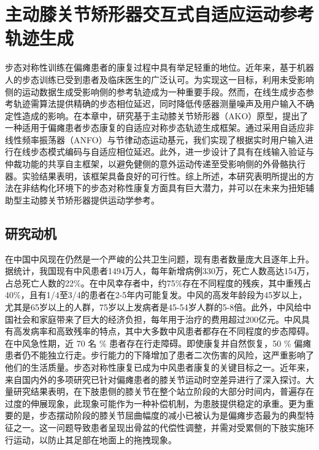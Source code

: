 \chapter{主动膝关节矫形器交互式自适应运动参考轨迹生成}
步态对称性训练在偏瘫患者的康复过程中具有举足轻重的地位。近年来，基于机器人的步态训练已受到患者及临床医生的广泛认可。为实现这一目标，利用未受影响侧的运动数据生成受影响侧的参考轨迹成为一种重要手段。然而，在线生成步态参考轨迹需算法提供精确的步态相位延迟，同时降低传感器测量噪声及用户输入不确定性造成的影响。在本章中，研究基于主动膝关节矫形器（AKO）原型，提出了一种适用于偏瘫患者步态康复的自适应对称步态轨迹生成框架。通过采用自适应非线性频率振荡器（ANFO）与节律动态运动基元，我们实现了根据实时用户输入进行在线步态模式编码与自适应相位延迟。此外，进一步设计了具有在线输入验证与仲裁功能的共享自主框架，以避免健侧的意外运动传递至受影响侧的外骨骼执行器。实验结果表明，该框架具备良好的可行性。综上所述，本研究表明所提出的方法在非结构化环境下的步态对称性康复方面具有巨大潜力，并可以在未来为扭矩辅助型主动膝关节矫形器提供运动学参考。
\section{研究动机}
在中国中风现在仍然是一个严峻的公共卫生问题，现有患者数量庞大且逐年上升。据统计，我国现有中风患者1494万人，每年新增病例330万，死亡人数高达154万，占总死亡人数的22\%。在中风幸存者中，约75\%存在不同程度的残疾，其中重残占40\%，且有1/4至3/4的患者在2-5年内可能复发。中风的高发年龄段为45岁以上，尤其是65岁以上的人群，75岁以上发病者是45-54岁人群的5-8倍。此外，中风给中国社会和家庭带来了巨大的经济负担，每年用于治疗的费用超过200亿元。中风具有高发病率和高致残率的特点，其中大多数中风患者都存在不同程度的步态障碍。在中风急性期，近 70 名 \% 患者存在行走障碍。即使康复并自然恢复，50 \% 偏瘫患者仍不能独立行走\cite{jorgensenRecoveryWalkingFunction1995}。步行能力的下降增加了患者二次伤害的风险，这严重影响了他们的生活质量\cite{balabanGaitDisturbancesPatients2014,yelnikClinicalGuideAssess1999}。步态对称性康复已成为中风患者康复的关键目标之一。近年来，来自国内外的多项研究已针对偏瘫患者的膝关节运动时空差异进行了深入探讨。大量研究结果表明，在下肢患侧的膝关节在整个站立阶段的大部分时间内，普遍存在过度的伸展现象\cite{woolleyCharacteristicsGaitHemiplegia2015}，此现象可能作为一种补偿机制，为患肢提供稳定的承重。更为重要的是，步态摆动阶段的膝关节屈曲幅度的减小已被认为是偏瘫步态最为的典型特征之一\cite{lucareliALTERATIONLOADRESPONSEMECHANISM2006,campaniniMethodDifferentiateCauses2013}。这一问题导致患者呈现出骨盆的代偿性调整，并需对受累侧的下肢实施环行运动，以防止其足部在地面上的拖拽现象\cite{cruzBiomechanicalImpairmentsGait2009}。



